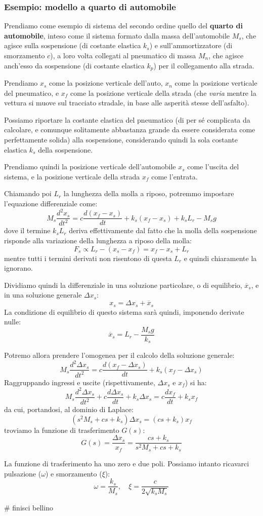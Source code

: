 \documentclass[a4paper,11pt]{article}
\begin{document}
\subsubsection{Esempio: modello a quarto di automobile}
Prendiamo come esempio di sistema del secondo ordine quello del \textbf{quarto di automobile}, inteso come il sistema formato dalla massa dell'automobile $M_s$, che agisce sulla sospensione (di costante elastica $k_s$) e sull'ammortizzatore (di smorzamento $c$), a loro volta collegati al pneumatico di massa $M_n$, che agisce anch'esso da sospensione (di costante elastica $k_p$) per il collegamento alla strada.

Prendiamo $x_s$ come la posizione verticale dell'auto, $x_n$ come la posizione verticale del pneumatico, e $x_f$ come la posizione verticale della strada (che \textit{varia} mentre la vettura si muove sul tracciato stradale, in base alle asperità stesse dell'asfalto).

Possiamo riportare la costante elastica del pneumatico (di per sé complicata da calcolare, e comunque solitamente abbastanza grande da essere considerata come perfettamente solida) alla sospensione, considerando quindi la sola costante elastica $k_s$ della sospensione.

Prendiamo quindi la posizione verticale dell'automobile $x_s$ come l'uscita del sistema, e la posizione verticale della strada $x_f$ come l'entrata.

Chiamando poi $L_r$ la lunghezza della molla a riposo, potremmo impostare l'equazione differenziale come:
$$
M_s \frac{d^2 x_s}{dt^2} = c \frac{d ( x_f - x_s )}{dt} + k_s (x_f - x_s) + k_s L_r - M_s g
$$
dove il termine $k_s L_r$ deriva effettivamente dal fatto che la molla della sospensione risponde alla variazione della lunghezza a riposo della molla:
$$
F_s \propto  L_r - (x_s - x_f) = x_f - x_s + L_r
$$
mentre tutti i termini derivati non risentono di questa $L_r$ e quindi chiaramente la ignorano.

Dividiamo quindi la differenziale in una soluzione particolare, o di equilibrio, $\overline{x}_s$, e in una soluzione generale $\Delta x_s$:
$$
x_s = \Delta x_s + \overline{x}_s
$$
La condizione di equilibrio di questo sistema sarà quindi, imponendo derivate nulle:
$$
\overline{x}_s = L_r - \frac{M_s g}{k_s}
$$

Potremo allora prendere l'omogenea per il calcolo della soluzione generale:
$$
M_s \frac{d^2 \Delta x_s}{dt^2} = c \frac{d ( x_f - \Delta x_s )}{dt} + k_s (x_f - \Delta x_s)
$$
Raggruppando ingressi e uscite (rispettivamente, $\Delta x_s$ e $x_f$) si ha:
$$
M_s \frac{d^2 \Delta x_s}{dt^2} + c \frac{d \Delta x_s}{dt} + k_s \Delta x_s = c \frac{dx_f}{dt} + k_s x_f
$$
da cui, portandosi, al dominio di Laplace:
$$
\left( s^2 M_s + cs + k_s \right) \Delta x_s = ( cs + k_s ) x_f
$$
troviamo la funzione di trasferimento $G(s)$:
$$
G(s) = \frac{\Delta x_s}{x_f} = \frac{c s + k_s}{s^2 M_s + c s + k_s}
$$

La funzione di trasferimento ha uno zero e due poli.
Possiamo intanto ricavarci pulsazione ($\omega$) e smorzamento ($\xi$):
$$
\omega = \frac{k_s}{M_s}, \quad \xi = \frac{c}{2 \sqrt{k_s M_s}}
$$

# finisci bellino
\end{document}
